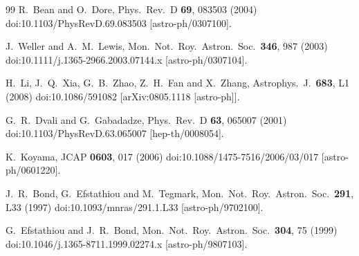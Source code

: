 \documentclass[floatfix,aps,amsmath,nofootinbib,onecolumn,10pt]{revtex4}
\begin{document}
\begin{thebibliography}{99}
  R.~Bean and O.~Dore,
  Phys.\ Rev.\ D {\bf 69}, 083503 (2004)
  doi:10.1103/PhysRevD.69.083503
  [astro-ph/0307100].
  
  J.~Weller and A.~M.~Lewis,
  Mon.\ Not.\ Roy.\ Astron.\ Soc.\  {\bf 346}, 987 (2003)
  doi:10.1111/j.1365-2966.2003.07144.x
  [astro-ph/0307104].
  
  H.~Li, J.~Q.~Xia, G.~B.~Zhao, Z.~H.~Fan and X.~Zhang,
  Astrophys.\ J.\  {\bf 683}, L1 (2008)
  doi:10.1086/591082
  [arXiv:0805.1118 [astro-ph]].
  
  G.~R.~Dvali and G.~Gabadadze,
  Phys.\ Rev.\ D {\bf 63}, 065007 (2001)
  doi:10.1103/PhysRevD.63.065007
  [hep-th/0008054].
  
  K.~Koyama,
  JCAP {\bf 0603}, 017 (2006)
  doi:10.1088/1475-7516/2006/03/017
  [astro-ph/0601220].
  
  J.~R.~Bond, G.~Efstathiou and M.~Tegmark,
  Mon.\ Not.\ Roy.\ Astron.\ Soc.\  {\bf 291}, L33 (1997)
  doi:10.1093/mnras/291.1.L33
  [astro-ph/9702100].
  
  G.~Efstathiou and J.~R.~Bond,
  Mon.\ Not.\ Roy.\ Astron.\ Soc.\  {\bf 304}, 75 (1999)
  doi:10.1046/j.1365-8711.1999.02274.x
  [astro-ph/9807103].


\end{thebibliography}
\end{document}
